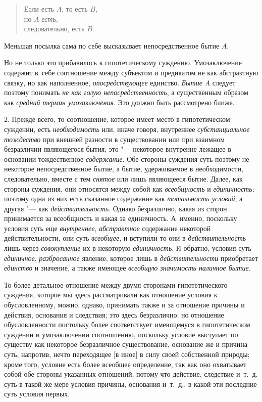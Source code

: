 \begin{verse}
Если есть $A$, то есть $B$,\\
но $A$ {\em есть},\\
следовательно, есть $B$.
\end{verse}

Меньшая посылка сама по себе высказывает непосредственное бытие $A$.

Но не только это прибавилось к гипотетическому суждению.
Умозаключение содержит в~себе соотношение между субъектом и предикатом не
как абстрактную связку, но как наполненное, {\em опосредствующее}
единство. {\em Бытие} $A$ следует поэтому понимать
{\em не как голую непосредственность}, а существенным образом как
{\em средний термин умозаключения}. Это должно быть рассмотрено ближе.

2. Прежде всего, то соотношение, которое имеет место в
гипотетическом суждении, есть {\em необходимость} или,
иначе говоря, внутреннее {\em субстанциальное тождество}
при внешней разности в существовании или при
взаимном безразличии являющегося бытия; это "--- некоторое
внутренне лежащее в основании тождественное {\em содержание}. Обе
стороны суждения суть поэтому не некоторое непосредственное бытие, а бытие,
удерживаемое в необходимости, следовательно, вместе с тем {\em снятое} или лишь
являющееся бытие. Далее, как стороны суждения, они относятся между собой
как {\em всеобщность} и {\em единичность;}
поэтому одна из них есть сказанное содержание как
{\em тотальность условий}, а другая "--- как {\em действительность}.
Однако безразлично, какая из сторон принимается за
всеобщность и какая за единичность. А~именно, поскольку условия суть еще
{\em внутреннее}, {\em абстрактное}
содержание некоторой действительности, они суть
{\em всеобщее}, и вступили-то они в {\em действительность}
лишь через {\em совокупление} их в некоторую {\em единичность}.
И обратно, условия суть {\em единичное}, {\em разбросанное}
явление, которое лишь в {\em действительности} приобретает {\em единство} и
значение, а также имеющее {\em всеобщую значимость наличное бытие}.

То более детальное отношение между двумя сторонами
гипотетического суждения, которое мы здесь рассматривали как отношение
условия к обусловленному, можно, однако, принимать также и за отношение
причины и действия, основания и следствия; это здесь безразлично; но
отношение обусловленности постольку более соответствует имеющемуся в
гипотетическом суждении и умозаключении соотношению, поскольку условие
выступает по существу как некоторое безразличное существование, основание
же и причина суть, напротив, нечто переходящее [в иное] в силу своей
собственной природы; кроме того, условие есть более всеобщее определение,
так как оно охватывает собой обе стороны указанных отношений, потому что
действие, следствие и~т.~д. суть в такой же мере условия причины, основания
и~т.~д., в какой эти последние суть условия первых.

